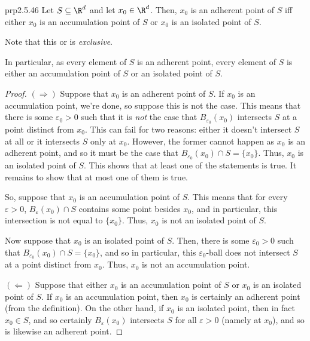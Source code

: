 \begin{prp}{}{prp2.5.46}
Let $S\subseteq \R ^d$ and let $x_0\in \R ^d$.  Then, $x_0$ is an adherent point of $S$ iff either $x_0$ is an accumulation point of $S$ or $x_0$ is an isolated point of $S$.
\begin{rmk}
Note that this or is \emph{exclusive}.
\end{rmk}
\begin{rmk}
In particular, as every element of $S$ is an adherent point, every element of $S$ is either an accumulation point of $S$ or an isolated point of $S$.
\end{rmk}
\begin{proof}
$(\Rightarrow )$ Suppose that $x_0$ is an adherent point of $S$.  If $x_0$ is an accumulation point, we're done, so suppose this is not the case.  This means that there is some $\varepsilon _0>0$ such that it is \emph{not} the case that $B_{\varepsilon _0}(x_0)$ intersects $S$ at a point distinct from $x_0$.  This can fail for two reasons:  either it doesn't intersect $S$ at all or it intersects $S$ only at $x_0$.  However, the former cannot happen as $x_0$ is an adherent point, and so it must be the case that $B_{\varepsilon _0}(x_0)\cap S=\{ x_0\}$.  Thus, $x_0$ is an isolated point of $S$.  This shows that at least one of the statements is true.  It remains to show that at most one of them is true.

So, suppose that $x_0$ is an accumulation point of $S$.  This means that for every $\varepsilon >0$, $B_{\varepsilon}(x_0)\cap S$ contains some point besides $x_0$, and in particular, this intersection is not equal to $\{ x_0\}$.  Thus, $x_0$ is not an isolated point of $S$.

Now suppose that $x_0$ is an isolated point of $S$.  Then, there is some $\varepsilon _0>0$ such that $B_{\varepsilon _0}(x_0)\cap S=\{ x_0\}$, and so in particular, this $\varepsilon _0$-ball does not intersect $S$ at a point distinct from $x_0$.  Thus, $x_0$ is not an accumulation point.

\blankline
\noindent
$(\Leftarrow )$ Suppose that either $x_0$ is an accumulation point of $S$ or $x_0$ is an isolated point of $S$.  If $x_0$ is an accumulation point, then $x_0$ is certainly an adherent point (from the definition).  On the other hand, if $x_0$ is an isolated point, then in fact $x_0\in S$, and so certainly $B_{\varepsilon}(x_0)$ intersects $S$ for all $\varepsilon >0$ (namely at $x_0$), and so is likewise an adherent point.
\end{proof}
\end{prp}

